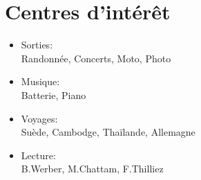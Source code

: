 \documentclass[]{friggeri-cv}
\begin{document}
\section{Centres d'intérêt}
\vspace*{-0.45cm}
\setlength{\columnsep}{-2cm}
\begin{multicols}{2}
\begin{itemize}
\setlength{\itemsep}{1pt}
\setlength{\parskip}{0pt}
\setlength{\parsep}{0pt}
\item Sorties: \\
Randonnée, Concerts,  Moto, Photo\\
\item Musique: \\
Batterie, Piano\\
\columnbreak
\item Voyages: \\
Suède, Cambodge, Thaïlande, Allemagne\\
\item Lecture: \\
B.Werber, M.Chattam, F.Thilliez
\end{itemize}
\end{multicols}
\end{document}
